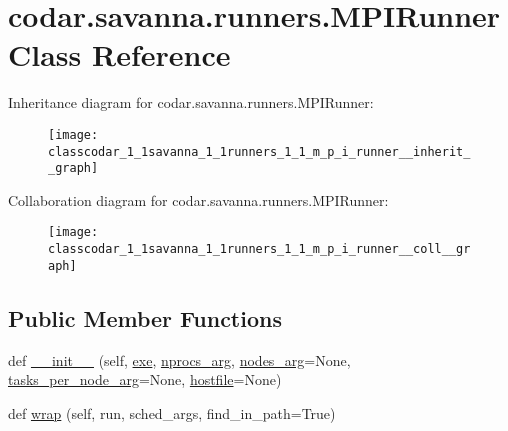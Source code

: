 \hypertarget{classcodar_1_1savanna_1_1runners_1_1_m_p_i_runner}{}\section{codar.\+savanna.\+runners.\+M\+P\+I\+Runner Class Reference}
\label{classcodar_1_1savanna_1_1runners_1_1_m_p_i_runner}


Inheritance diagram for codar.\+savanna.\+runners.\+M\+P\+I\+Runner\+:
\nopagebreak
\begin{figure}[H]
\begin{center}
\leavevmode
\texttt{[image: classcodar\_1\_1savanna\_1\_1runners\_1\_1\_m\_p\_i\_runner\_\_inherit\_\_graph]}
\end{center}
\end{figure}


Collaboration diagram for codar.\+savanna.\+runners.\+M\+P\+I\+Runner\+:
\nopagebreak
\begin{figure}[H]
\begin{center}
\leavevmode
\texttt{[image: classcodar\_1\_1savanna\_1\_1runners\_1\_1\_m\_p\_i\_runner\_\_coll\_\_graph]}
\end{center}
\end{figure}
\subsection*{Public Member Functions}
\begin{DoxyCompactItemize}
\item 
def \hyperlink{classcodar_1_1savanna_1_1runners_1_1_m_p_i_runner_a67662602e1fe9901e20e17a9f16b8259}{\+\_\+\+\_\+init\+\_\+\+\_\+} (self, \hyperlink{classcodar_1_1savanna_1_1runners_1_1_m_p_i_runner_a7ccd767eb30cbd555f387e5b4d781ffa}{exe}, \hyperlink{classcodar_1_1savanna_1_1runners_1_1_m_p_i_runner_aafcba954932f2160d43e820cf3abe6e1}{nprocs\+\_\+arg}, \hyperlink{classcodar_1_1savanna_1_1runners_1_1_m_p_i_runner_ad139718b16183bd45520e166d6d2b9b9}{nodes\+\_\+arg}=None, \hyperlink{classcodar_1_1savanna_1_1runners_1_1_m_p_i_runner_a58bd05be3e876f5a8f2522262ba934f7}{tasks\+\_\+per\+\_\+node\+\_\+arg}=None, \hyperlink{classcodar_1_1savanna_1_1runners_1_1_m_p_i_runner_ad36885eab0821c149e8798ffbf567af4}{hostfile}=None)
\item 
def \hyperlink{classcodar_1_1savanna_1_1runners_1_1_m_p_i_runner_a2eb86e6b8495ecf2361dc58e4b05c7c5}{wrap} (self, run, sched\+\_\+args, find\+\_\+in\+\_\+path=True)
\end{DoxyCompactItemize}
